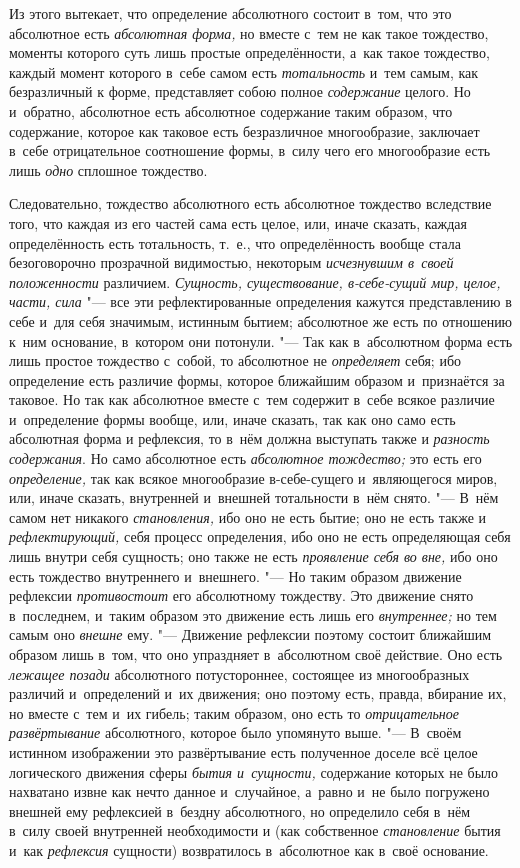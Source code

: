 Из этого вытекает, что определение абсолютного состоит в~том, что это
абсолютное есть {\em абсолютная форма,} но вместе с~тем
не как такое тождество, моменты которого суть лишь простые определённости,
а~как такое тождество, каждый момент которого в~себе самом есть
{\em тотальность} и~тем самым, как безразличный к
форме, представляет собою полное {\em содержание}
целого. Но и~обратно, абсолютное есть абсолютное содержание таким образом,
что содержание, которое как таковое есть безразличное многообразие,
заключает в~себе отрицательное соотношение формы, в~силу чего его
многообразие есть лишь {\em одно} сплошное тождество.

Следовательно, тождество абсолютного есть абсолютное тождество вследствие
того, что каждая из его частей сама есть целое, или, иначе сказать, каждая
определённость есть тотальность, т.~е., что определённость вообще стала
безоговорочно прозрачной видимостью, некоторым
{\em исчезнувшим в~своей положенности} различием.
{\em Сущность, существование, в-себе-сущий мир, целое,
части, сила} "--- все эти рефлектированные определения кажутся представлению в
себе и~для себя значимым, истинным бытием; абсолютное же есть по отношению
к~ним основание, в~котором они потонули. "--- Так как в~абсолютном форма есть
лишь простое тождество с~собой, то абсолютное не
{\em определяет} себя; ибо определение есть различие
формы, которое ближайшим образом и~признаётся за таковое. Но так как
абсолютное вместе с~тем содержит в~себе всякое различие и~определение формы
вообще, или, иначе сказать, так как оно само есть абсолютная форма и
рефлексия, то в~нём должна выступать также и
{\em разность содержания}. Но само абсолютное есть
{\em абсолютное тождество;} это есть его
{\em определение,} так как всякое многообразие
в-себе-сущего и~являющегося миров, или, иначе сказать, внутренней и~внешней
тотальности в~нём снято. "--- В~нём самом нет никакого
{\em становления,} ибо оно не есть бытие; оно не есть
также и {\em рефлектирующий,} себя процесс определения,
ибо оно не есть определяющая себя лишь внутри себя сущность; оно также не
есть {\em проявление себя во вне,} ибо оно есть
тождество внутреннего и~внешнего. "--- Но таким образом движение рефлексии
{\em противостоит} его абсолютному тождеству. Это
движение снято в~последнем, и~таким образом это движение есть лишь его
{\em внутреннее;} но тем самым оно
{\em внешне} ему. "--- Движение рефлексии поэтому состоит
ближайшим образом лишь в~том, что оно упраздняет в~абсолютном своё
действие. Оно есть {\em лежащее позади} абсолютного
потустороннее, состоящее из многообразных различий и~определений и~их
движения; оно поэтому есть, правда, вбирание их, но вместе с~тем и~их
гибель; таким образом, оно есть то {\em отрицательное
развёртывание} абсолютного, которое было упомянуто выше. "--- В~своём истинном
изображении это развёртывание есть полученное доселе всё целое логического
движения сферы {\em бытия и~сущности,} содержание
которых не было нахватано извне как нечто данное и~случайное, а~равно и~не
было погружено внешней ему рефлексией в~бездну абсолютного, но определило
себя в~нём в~силу своей внутренней необходимости и (как собственное
{\em становление} бытия и~как
{\em рефлексия} сущности) возвратилось в~абсолютное как
в~своё основание.

